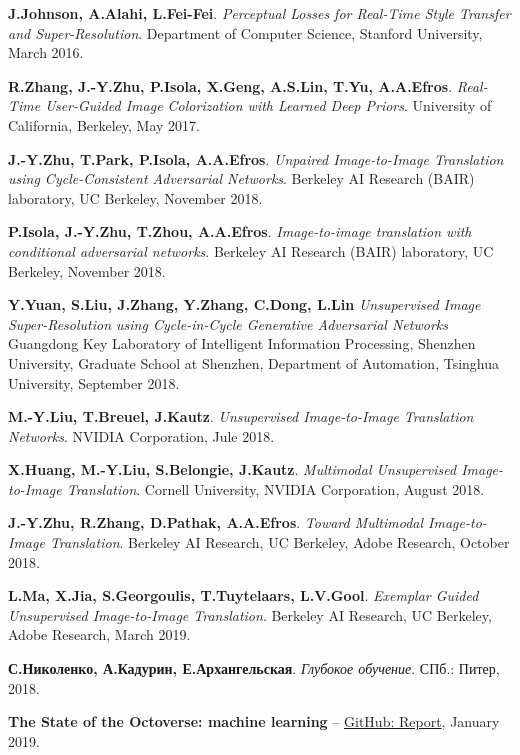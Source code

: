 \documentclass[11pt,a4paper]{extarticle}
\begin{document}
\begin{thebibliography}{00}

	\textbf{J.Johnson, A.Alahi, L.Fei-Fei}.
	\emph{Perceptual Losses for Real-Time Style Transfer and Super-Resolution}.
	Department of Computer Science, Stanford University,
	March 2016.

	\textbf{R.Zhang, J.-Y.Zhu, P.Isola, X.Geng, A.S.Lin, T.Yu, A.A.Efros}.
	\emph{Real-Time User-Guided Image Colorization with Learned Deep Priors}.
	University of California, Berkeley,
	May 2017.

	\textbf{J.-Y.Zhu, T.Park, P.Isola, A.A.Efros}.
	\emph{Unpaired Image-to-Image Translation using Cycle-Consistent Adversarial Networks}.
	Berkeley AI Research (BAIR) laboratory, UC Berkeley,
	November 2018.

	\textbf{P.Isola, J.-Y.Zhu, T.Zhou, A.A.Efros}.
	\emph{Image-to-image translation with conditional adversarial networks}.
	Berkeley AI Research (BAIR) laboratory, UC Berkeley,
	November 2018.

	\textbf{Y.Yuan, S.Liu, J.Zhang, Y.Zhang, C.Dong, L.Lin}
	\emph{Unsupervised Image Super-Resolution using Cycle-in-Cycle Generative Adversarial Networks}
	Guangdong Key Laboratory of Intelligent Information Processing, Shenzhen University,
	Graduate School at Shenzhen, Department of Automation, Tsinghua University,
	September 2018.

	\textbf{M.-Y.Liu, T.Breuel, J.Kautz}.
	\emph{Unsupervised Image-to-Image Translation Networks}.
	NVIDIA Corporation,
	Jule 2018.
	
	\textbf{X.Huang, M.-Y.Liu, S.Belongie, J.Kautz}.
	\emph{Multimodal Unsupervised Image-to-Image Translation}.
	Cornell University, NVIDIA Corporation,
	August 2018.

	\textbf{J.-Y.Zhu, R.Zhang, D.Pathak, A.A.Efros}.
	\emph{Toward Multimodal Image-to-Image Translation}.
	Berkeley AI Research, UC Berkeley, Adobe Research,
	October 2018.

	\textbf{L.Ma, X.Jia, S.Georgoulis, T.Tuytelaars, L.V.Gool}.
	\emph{Exemplar Guided Unsupervised Image-to-Image Translation}.
	Berkeley AI Research, UC Berkeley, Adobe Research,
	March 2019.
	
	\textbf{С.Николенко, А.Кадурин, Е.Архангельская}.
	\emph{Глубокое обучение}.
	СПб.: Питер, 
	2018.

	\textbf{The State of the Octoverse: machine learning} --
	\href{https://github.blog/2019-01-24-the-state-of-the-octoverse-machine-learning/}{GitHub: Report},
	January 2019.

\end{thebibliography}
\end{document}
